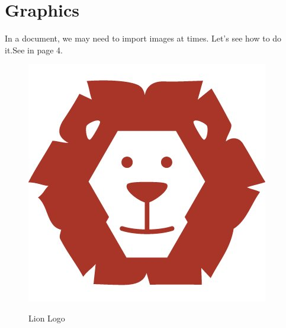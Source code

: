 \documentclass[14pt]{article}
\begin{document}
\section{Graphics}
In a document, we may need to import images at times. Let’s see how to do it.See in page 4.
\begin{figure}[h]
	\centering
	\includegraphics[scale=0.4]{lion.jpg}
	\label{fig:1}
	\caption{Lion Logo}
\end{figure}
\end{document}
